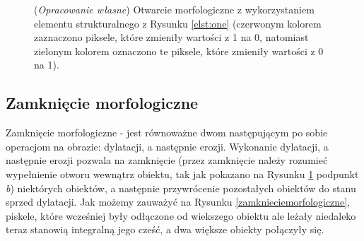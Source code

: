 \documentclass{article}
\begin{document}
        \begin{figure}[H]
            \centering
            \qquad
            \qquad
            \caption
            {
                (\textit{Opracowanie własne}) Otwarcie morfologiczne z wykorzystaniem elementu strukturalnego z Rysunku \ref{elst:one} (czerwonym kolorem zaznaczono piksele, które zmieniły wartości z 1 na 0, natomiast zielonym kolorem oznaczono te piksele, które zmieniły wartości z 0 na 1).
            }
            \label{otwarciemorfologiczne}
        \end{figure}

        \newpage
        \subsection{Zamknięcie morfologiczne}
        {
            \label{sec:zamkniecie-morfologiczne}
            \Large
            \justifying
            \quad
            Zamknięcie morfologiczne - jest równoważne dwom następującym po sobie operacjom na obrazie: dylatacji, a następnie erozji.
            Wykonanie dylatacji, a następnie erozji pozwala na zamknięcie (przez zamknięcie należy rozumieć wypełnienie otworu wewnątrz obiektu, tak jak pokazano na Rysunku \ref{otwarciemorfologiczne} podpunkt \textit{b}) niektórych obiektów, a następnie przywrócenie pozostałych obiektów do stanu sprzed dylatacji.
            Jak możemy zauważyć na Rysunku \ref{zamknieciemorfologiczne}, piskele, które wcześniej były odłączone od wiekszego obiektu ale leżały niedaleko teraz stanowią integralną jego cześć, a dwa większe obiekty połączyły się.
        }
\end{document}
